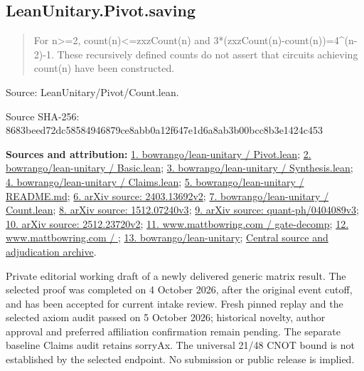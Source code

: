\documentclass[11pt,a4paper]{article}
\begin{document}
\begin{samepage}
\subsection{LeanUnitary.Pivot.saving}
\begin{quote}\small\ttfamily For n>=2, count(n)<=zxzCount(n) and 3*(zxzCount(n)-count(n))=4\textasciicircum{}(n-2)-1. These recursively defined counts do not assert that circuits achieving count(n) have been constructed.\end{quote}
{\small Source: LeanUnitary/Pivot/Count.lean.\par}

{\small Source SHA-256: 8683beed72dc58584946879ce8abb0a12f647e1d6a8ab3b00bcc8b3e1424c453\par}

{\small\textbf{Sources and attribution:} \href{https://github.com/bowrango/lean-unitary/blob/7014b63ee2cfd01c641a7f539c73b664a2aa3d66/LeanUnitary/Pivot/Existence/Pivot.lean}{1. bowrango/lean-unitary / Pivot.lean}; \href{https://github.com/bowrango/lean-unitary/blob/7014b63ee2cfd01c641a7f539c73b664a2aa3d66/LeanUnitary/Pivot/Multiplexor/Basic.lean}{2. bowrango/lean-unitary / Basic.lean}; \href{https://github.com/bowrango/lean-unitary/blob/7014b63ee2cfd01c641a7f539c73b664a2aa3d66/LeanUnitary/Pivot/Synthesis.lean}{3. bowrango/lean-unitary / Synthesis.lean}; \href{https://github.com/bowrango/lean-unitary/blob/7014b63ee2cfd01c641a7f539c73b664a2aa3d66/LeanUnitary/Claims.lean}{4. bowrango/lean-unitary / Claims.lean}; \href{https://github.com/bowrango/lean-unitary/blob/7014b63ee2cfd01c641a7f539c73b664a2aa3d66/LeanUnitary/README.md}{5. bowrango/lean-unitary / README.md}; \href{https://arxiv.org/abs/2403.13692v2}{6. arXiv source: 2403.13692v2}; \href{https://github.com/bowrango/lean-unitary/blob/7014b63ee2cfd01c641a7f539c73b664a2aa3d66/LeanUnitary/Pivot/Count.lean}{7. bowrango/lean-unitary / Count.lean}; \href{https://arxiv.org/abs/1512.07240v3}{8. arXiv source: 1512.07240v3}; \href{https://arxiv.org/abs/quant-ph/0404089v3}{9. arXiv source: quant-ph/0404089v3}; \href{https://arxiv.org/html/2512.23720v2}{10. arXiv source: 2512.23720v2}; \href{https://www.mattbowring.com/posts/gate-decomp/}{11. www.mattbowring.com / gate-decomp}; \href{https://www.mattbowring.com/}{12. www.mattbowring.com / }; \href{https://github.com/bowrango/lean-unitary/tree/7014b63ee2cfd01c641a7f539c73b664a2aa3d66}{13. bowrango/lean-unitary}; \href{https://github.com/alejandrozu/openmath-2026-judging}{Central source and adjudication archive}.\par}

\end{samepage}
{\small Private editorial working draft of a newly delivered generic matrix result. The selected proof was completed on 4 October 2026, after the original event cutoff, and has been accepted for current intake review. Fresh pinned replay and the selected axiom audit passed on 5 October 2026; historical novelty, author approval and preferred affiliation confirmation remain pending. The separate baseline Claims audit retains sorryAx. The universal 21/48 CNOT bound is not established by the selected endpoint. No submission or public release is implied.\par}
\end{document}
